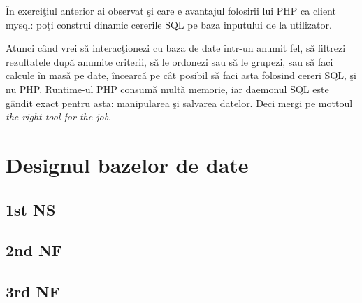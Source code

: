 În exerciţiul anterior ai observat şi care e avantajul folosirii lui
PHP ca client mysql: poţi construi dinamic cererile SQL pe baza
inputului de la utilizator.

Atunci când vrei să interacţionezi cu baza de date într-un anumit fel,
să filtrezi rezultatele după anumite criterii, să le ordonezi sau să
le grupezi, sau să faci calcule în masă pe date, încearcă pe cât posibil
să faci asta folosind cereri SQL, şi nu PHP. Runtime-ul PHP consumă
multă memorie, iar daemonul SQL este gândit exact pentru asta: manipularea
şi salvarea datelor. Deci mergi pe mottoul \textsl{the right tool for
the job}.


\section{Designul bazelor de date}








\subsection{1st NS}

\subsection{2nd NF}

\subsection{3rd NF}





